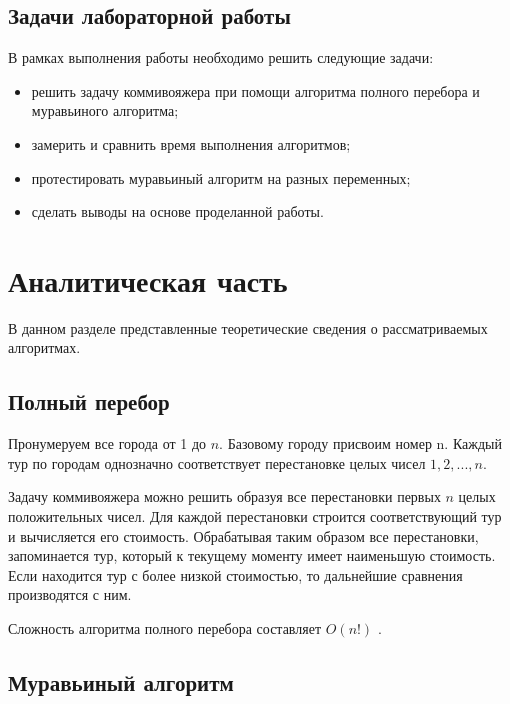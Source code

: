 \documentclass[12pt]{report}
\begin{document}
\section*{Задачи лабораторной работы}
	
В рамках выполнения работы необходимо решить следующие задачи:
	
\begin{itemize}
	\item решить задачу коммивояжера при помощи алгоритма полного перебора и муравьиного алгоритма;
	\item замерить и сравнить время выполнения алгоритмов;
	\item протестировать муравьиный алгоритм на разных переменных;
	\item сделать выводы на основе проделанной работы.
\end{itemize}
	
\chapter{Аналитическая часть}
	
В данном разделе представленные теоретические сведения о рассматриваемых алгоритмах.

\section{Полный перебор}

Пронумеруем все города от 1 до $n$. Базовому городу присвоим номер n. Каждый тур по городам однозначно соответствует перестановке целых чисел $1, 2, ..., n$.


Задачу коммивояжера можно решить образуя все перестановки первых $n$ целых положительных чисел. Для каждой перестановки строится соответствующий тур и вычисляется его стоимость. Обрабатывая таким образом все перестановки, запоминается тур, который к текущему моменту имеет наименьшую стоимость. Если находится тур с более низкой стоимостью, то дальнейшие сравнения производятся с ним.


Сложность алгоритма полного перебора составляет $O(n!)$ \cite{goodman}.
	
\section{Муравьиный алгоритм}
\end{document}
